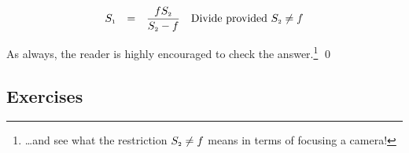\begin{ex}
\begin{enumerate}
\[\begin{array}{rclr}
S_{\text{\tiny $1$}} & = & \dfrac{f S_{\text{\tiny $2$}}}{S_{\text{\tiny $2$}} - f} & \text{Divide provided  $S_{\text{\tiny $2$}} \neq f$}  \\

\end{array}\]

As always, the reader is highly encouraged to check the answer.\footnote{\ldots and see what the restriction $S_{\text{\tiny $2$}} \neq f$ means in terms of focusing a camera!}  \qed

\end{enumerate}

\end{ex}

\newpage

\subsection{Exercises}



\closegraphsfile
